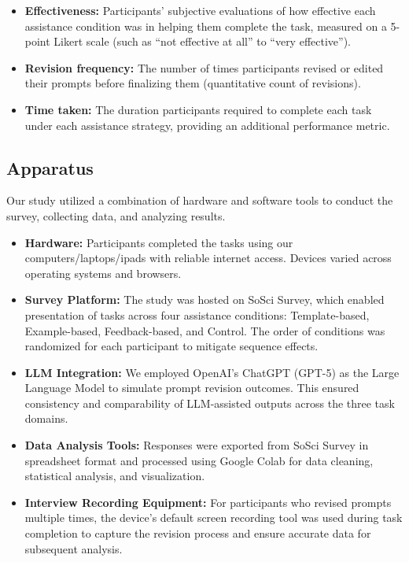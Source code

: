 \begin{itemize}
    \item \textbf{Effectiveness:} Participants' subjective evaluations of how effective each assistance condition was in helping them complete the task, measured on a 5-point Likert scale (such as ``not effective at all'' to ``very effective'').
    
    \item \textbf{Revision frequency:} The number of times participants revised or edited their prompts before finalizing them (quantitative count of revisions).
    
    \item \textbf{Time taken:} The duration participants required to complete each task under each assistance strategy, providing an additional performance metric.
\end{itemize}

\subsection{\textbf{Apparatus}}
Our study utilized a combination of hardware and software tools to conduct the survey, collecting data, and analyzing results.
\begin{itemize}
    \item \textbf{Hardware:} Participants completed the tasks using our computers/laptops/ipads with reliable internet access. Devices varied across operating systems and browsers.

    \item \textbf{Survey Platform:} The study was hosted on SoSci Survey, which enabled presentation of tasks across four assistance conditions: Template-based, Example-based, Feedback-based, and Control. The order of conditions was randomized for each participant to mitigate sequence effects.
    
    \item \textbf{LLM Integration:} We employed OpenAI’s ChatGPT (GPT-5) as the Large Language Model to simulate prompt revision outcomes. This ensured consistency and comparability of LLM-assisted outputs across the three task domains.
    
    \item \textbf{Data Analysis Tools:} Responses were exported from SoSci Survey in spreadsheet format and processed using Google Colab for data cleaning, statistical analysis, and visualization.

    \item \textbf{Interview Recording Equipment:} For participants who revised prompts multiple times, the device’s default screen recording tool was used during task completion to capture the revision process and ensure accurate data for subsequent analysis.
    
\end{itemize}


